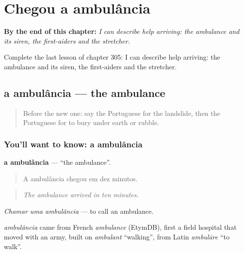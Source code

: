 
\chapter{Chegou a ambulância}
\label{ch:pt-chegou-a-ambulancia}

\begin{chapteropening}
\textbf{By the end of this chapter:} \emph{I can describe help arriving: the ambulance and its siren, the first-aiders and the stretcher.}

Complete the last lesson of chapter 305: I can describe help arriving: the ambulance and its siren, the first-aiders and the stretcher.
\end{chapteropening}

\section[a ambulância]{a ambulância — the ambulance}

\label{lesson:PT-C305-ambulancia}



\begin{quote}
Before the new one: say the Portuguese for the landslide, then the Portuguese for to bury under earth or rubble.
\end{quote}

\subsection*{You'll want to know: a ambulância}
\textbf{a ambulância} — \textquotedblleft{}the ambulance\textquotedblright{}.

\begin{quote}
A ambulância chegou em dez minutos.
\end{quote}

\begin{quote}
\emph{The ambulance arrived in ten minutes.}
\end{quote}

\emph{Chamar uma ambulância} — to call an ambulance.

\begin{cousinweb}
\emph{ambulância} came from French \emph{ambulance} (EtymDB), first a field hospital that moved with an army, built on \emph{ambulant} \textquotedblleft{}walking\textquotedblright{}, from Latin \emph{ambulāre} \textquotedblleft{}to walk\textquotedblright{}.
\end{cousinweb}

